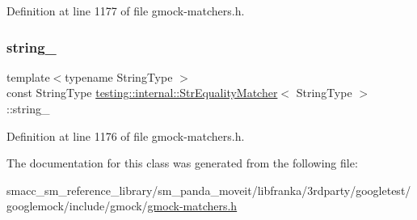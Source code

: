 Definition at line 1177 of file gmock-\/matchers.\+h.

\mbox{\label{classtesting_1_1internal_1_1StrEqualityMatcher_af6967de4d57d461f3e7c98bece4d1f48}} 
\subsubsection{\texorpdfstring{string\+\_\+}{string\_}}
{\footnotesize\ttfamily template$<$typename String\+Type $>$ \\
const String\+Type \hyperlink{classtesting_1_1internal_1_1StrEqualityMatcher}{testing\+::internal\+::\+Str\+Equality\+Matcher}$<$ String\+Type $>$\+::string\+\_\+\hspace{0.3cm}{\ttfamily [private]}}



Definition at line 1176 of file gmock-\/matchers.\+h.



The documentation for this class was generated from the following file\+:\begin{DoxyCompactItemize}
\item 
smacc\+\_\+sm\+\_\+reference\+\_\+library/sm\+\_\+panda\+\_\+moveit/libfranka/3rdparty/googletest/googlemock/include/gmock/\hyperlink{gmock-matchers_8h}{gmock-\/matchers.\+h}\end{DoxyCompactItemize}
